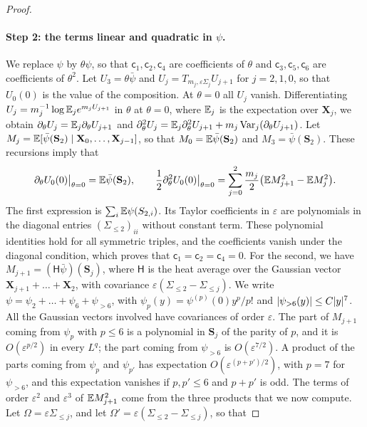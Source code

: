 \begin{proof}
\paragraph{Step 2: the terms linear and quadratic in $\psi$.} We replace $\psi$ by
$\theta\psi$, so that $\mathsf c_1,\mathsf c_2,\mathsf c_4$ are coefficients of $\theta$ and
$\mathsf c_3,\mathsf c_5,\mathsf c_6$ are coefficients of $\theta^2$. Let $U_3=\theta\bar\psi$ and
$U_j=T_{m_j,\varepsilon\Sigma_j}U_{j+1}$ for $j=2,1,0$, so that $U_0(0)$ is the
value of the composition. At $\theta=0$ all $U_j$ vanish. Differentiating
$U_j=m_j^{-1}\log\mathbb E_je^{m_jU_{j+1}}$ in $\theta$ at $\theta=0$, where $\mathbb E_j$ is
the expectation over $\mathbf X_j$, we obtain
$\partial_\theta U_j=\mathbb E_j\partial_\theta U_{j+1}$ and
$\partial_\theta^2U_j=\mathbb E_j\partial_\theta^2U_{j+1}+m_j\operatorname{Var}_j(\partial_\theta
U_{j+1})$. Let $M_j=\mathbb E[\bar\psi(\mathbf S_2)\mid\mathbf X_0,\dots,\mathbf X_{j-1}]$,
so that $M_0=\mathbb E\bar\psi(\mathbf S_2)$ and $M_3=\bar\psi(\mathbf S_2)$. These recursions imply
that
\[
 \partial_\theta U_0(0)\big|_{\theta=0}=\mathbb E\bar\psi(\mathbf S_2),\qquad
 \frac12\partial_\theta^2U_0(0)\big|_{\theta=0}
 =\sum_{j=0}^2\frac{m_j}2\bigl(\mathbb E M_{j+1}^2-\mathbb E M_j^2\bigr).
\]
The first expression is $\sum_i\mathbb E\psi(S_{2,i})$. Its Taylor coefficients in
$\varepsilon$ are polynomials in the diagonal entries $(\Sigma_{\le2})_{ii}$
without constant term. These polynomial identities hold for all symmetric
triples, and the coefficients vanish under the diagonal condition, which proves that
$\mathsf c_1=\mathsf c_2=\mathsf c_4=0$. For the second, we have
$M_{j+1}=(\mathsf H\bar\psi)(\mathbf S_j)$, where $\mathsf H$ is the heat average over
the Gaussian vector $\mathbf X_{j+1}+\dots+\mathbf X_2$, with covariance
$\varepsilon(\Sigma_{\le2}-\Sigma_{\le j})$. We write
$\psi=\psi_2+\dots+\psi_6+\psi_{>6}$, with $\psi_p(y)=\psi^{(p)}(0)y^p/p!$ and
$\lvert \psi_{>6}(y)\rvert\le C\lvert y\rvert^7$. All the Gaussian vectors involved have
covariances of order $\varepsilon$. The part of $M_{j+1}$ coming from $\psi_p$
with $p\le6$ is a polynomial in $\mathbf S_j$ of the parity of $p$, and it is
$O(\varepsilon^{p/2})$ in every $L^q$; the part coming from $\psi_{>6}$ is
$O(\varepsilon^{7/2})$. A product of the parts coming from $\psi_p$ and
$\psi_{p'}$ has expectation $O(\varepsilon^{(p+p')/2})$, with $p=7$
for $\psi_{>6}$, and this expectation vanishes if $p,p'\le6$ and $p+p'$ is
odd. The terms of order $\varepsilon^2$ and $\varepsilon^3$ of
$\mathbb E M_{j+1}^2$ come from the three products that we now compute. Let
$\Omega=\varepsilon\Sigma_{\le j}$, and let
$\Omega'=\varepsilon(\Sigma_{\le2}-\Sigma_{\le j})$, so that

\end{proof}
